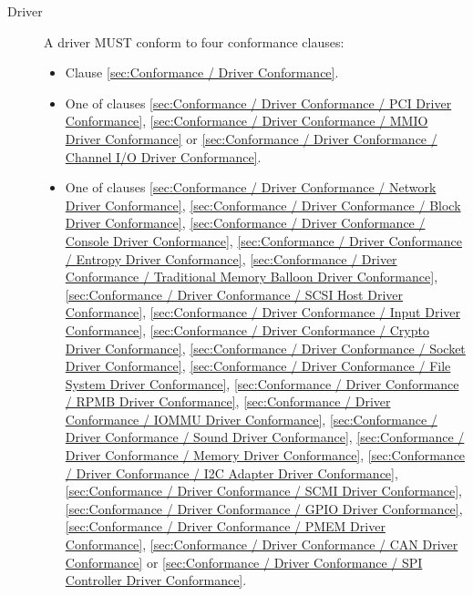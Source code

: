 \begin{description}
\item[Driver] A driver MUST conform to four conformance clauses:
  \begin{itemize}
    \item Clause \ref{sec:Conformance / Driver Conformance}.
    \item One of clauses \ref{sec:Conformance / Driver Conformance / PCI Driver Conformance}, \ref{sec:Conformance / Driver Conformance / MMIO Driver Conformance} or \ref{sec:Conformance / Driver Conformance / Channel I/O Driver Conformance}.
    \item One of clauses
\ref{sec:Conformance / Driver Conformance / Network Driver Conformance},
\ref{sec:Conformance / Driver Conformance / Block Driver Conformance},
\ref{sec:Conformance / Driver Conformance / Console Driver Conformance},
\ref{sec:Conformance / Driver Conformance / Entropy Driver Conformance},
\ref{sec:Conformance / Driver Conformance / Traditional Memory Balloon Driver Conformance},
\ref{sec:Conformance / Driver Conformance / SCSI Host Driver Conformance},
\ref{sec:Conformance / Driver Conformance / Input Driver Conformance},
\ref{sec:Conformance / Driver Conformance / Crypto Driver Conformance},
\ref{sec:Conformance / Driver Conformance / Socket Driver Conformance},
\ref{sec:Conformance / Driver Conformance / File System Driver Conformance},
\ref{sec:Conformance / Driver Conformance / RPMB Driver Conformance},
\ref{sec:Conformance / Driver Conformance / IOMMU Driver Conformance},
\ref{sec:Conformance / Driver Conformance / Sound Driver Conformance},
\ref{sec:Conformance / Driver Conformance / Memory Driver Conformance},
\ref{sec:Conformance / Driver Conformance / I2C Adapter Driver Conformance},
\ref{sec:Conformance / Driver Conformance / SCMI Driver Conformance},
\ref{sec:Conformance / Driver Conformance / GPIO Driver Conformance},
\ref{sec:Conformance / Driver Conformance / PMEM Driver Conformance},
\ref{sec:Conformance / Driver Conformance / CAN Driver Conformance} or
\ref{sec:Conformance / Driver Conformance / SPI Controller Driver Conformance}.


\end{itemize}
\end{description}
